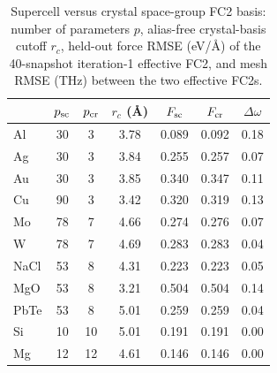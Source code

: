 \begin{table}[t]
\caption{Supercell versus crystal space-group FC2 basis: number of parameters $p$, alias-free crystal-basis cutoff $r_c$, held-out force RMSE (eV/\AA) of the 40-snapshot iteration-1 effective FC2, and mesh RMSE (THz) between the two effective FC2s.}
\label{tab:basis}
\begin{ruledtabular}
\begin{tabular}{lcccccc}
 & $p_{\rm sc}$ & $p_{\rm cr}$ & $r_c$ (\AA) & $F_{\rm sc}$ & $F_{\rm cr}$ & $\Delta\omega$\\
\hline
Al & 30 & 3 & 3.78 & 0.089 & 0.092 & 0.18\\
Ag & 30 & 3 & 3.84 & 0.255 & 0.257 & 0.07\\
Au & 30 & 3 & 3.85 & 0.340 & 0.347 & 0.11\\
Cu & 90 & 3 & 3.42 & 0.320 & 0.319 & 0.13\\
Mo & 78 & 7 & 4.66 & 0.274 & 0.276 & 0.07\\
W & 78 & 7 & 4.69 & 0.283 & 0.283 & 0.04\\
NaCl & 53 & 8 & 4.31 & 0.223 & 0.223 & 0.05\\
MgO & 53 & 8 & 3.21 & 0.504 & 0.504 & 0.14\\
PbTe & 53 & 8 & 5.01 & 0.259 & 0.259 & 0.04\\
Si & 10 & 10 & 5.01 & 0.191 & 0.191 & 0.00\\
Mg & 12 & 12 & 4.61 & 0.146 & 0.146 & 0.00\\
\end{tabular}
\end{ruledtabular}
\end{table}
